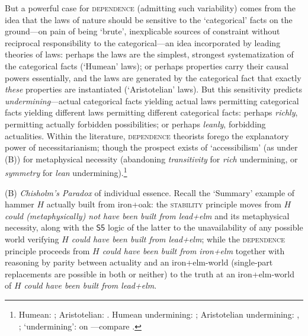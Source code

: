 \documentclass[12pt]{article}
\begin{document}
But a powerful case for \textsc{dependence} (admitting such variability) comes
from the idea that the laws of nature should be sensitive to the `categorical'
facts on the ground---on pain of being `brute', inexplicable sources of
constraint without reciprocal responsibility to the categorical---an idea
incorporated by leading theories of laws: perhaps the laws are the simplest,
strongest systematization of the categorical facts (`Humean' laws); or perhaps
properties carry their causal powers essentially, and the laws are generated by the
categorical fact that exactly \emph{these} properties are instantiated
(`Aristotelian' laws). But this sensitivity predicts
\emph{undermining}---actual categorical facts yielding actual laws permitting
categorical facts yielding different laws permitting different categorical
facts: perhaps \emph{richly}, permitting actually forbidden possibilities; or
perhaps \emph{leanly}, forbidding actualities. Within the literature,
\textsc{dependence} theorists forego the explanatory power of
necessitarianism; though the prospect exists of `accessibilism' (as under (B))
for metaphysical necessity (abandoning \emph{transitivity} for \emph{rich}
undermining, or \emph{symmetry} for \emph{lean} undermining).\footnote{Humean:
\citep[sec.~3.3]{lewis73}; Aristotelian: \citep{shoemaker80}. Humean
undermining: \citep[p.~20]{lewis86}; Aristotelian undermining:
\citep[sec.~3.1]{carroll94}, \citep[p.~244--5]{finevn}; `undermining':
\citep[p.~xv]{lewis86intro} on \citep{lewis80}---compare
\citep[p.~246n16]{finevn}.} 

(B) \emph{Chisholm's Paradox} of individual essence. Recall the `Summary'
example of hammer $H$ actually built from iron+oak: the \textsc{stability}
principle moves from \emph{$H$ could (metaphysically) not have been built from
lead+elm} and its metaphysical necessity, along with the $\mathsf{S5}$ logic
of the latter to the unavailability of any possible world verifying \emph{$H$
could have been built from lead+elm}; while the \textsc{dependence} principle
proceeds from \emph{$H$ could have been built from iron+elm} together with
reasoning by parity between actuality and an iron+elm-world (single-part
replacements are possible in both or neither) to the truth at an
iron+elm-world of \emph{$H$ could have been built from lead+elm}.
\end{document}
